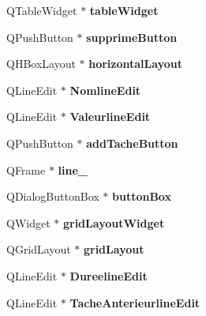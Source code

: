 \begin{DoxyCompactItemize}
Q\+Table\+Widget $\ast$ {\bfseries table\+Widget}
\item 
\mbox{\label{classUi__Dialog_a5f23c6524a49d1c5d2004cf289be792f}} 
Q\+Push\+Button $\ast$ {\bfseries supprime\+Button}
\item 
\mbox{\label{classUi__Dialog_ae66a1da203f045e33d71ed5abd46d2a1}} 
Q\+H\+Box\+Layout $\ast$ {\bfseries horizontal\+Layout}
\item 
\mbox{\label{classUi__Dialog_a848b9c33aa915967116a85f316b00de1}} 
Q\+Line\+Edit $\ast$ {\bfseries Nomline\+Edit}
\item 
\mbox{\label{classUi__Dialog_a62662d2bb293f62bb4391379c5955222}} 
Q\+Line\+Edit $\ast$ {\bfseries Valeurline\+Edit}
\item 
\mbox{\label{classUi__Dialog_afaaeb7b72ebafb7cc48b17030d584bd3}} 
Q\+Push\+Button $\ast$ {\bfseries add\+Tache\+Button}
\item 
\mbox{\label{classUi__Dialog_ab50855f90aba5911158d5e5d87784232}} 
Q\+Frame $\ast$ {\bfseries line\+\_}
\item 
\mbox{\label{classUi__Dialog_a5991d63e5d8f30a9a29671aeb370439a}} 
Q\+Dialog\+Button\+Box $\ast$ {\bfseries button\+Box}
\item 
\mbox{\label{classUi__Dialog_af56f0c59b650c50a635d4b11890c172e}} 
Q\+Widget $\ast$ {\bfseries grid\+Layout\+Widget}
\item 
\mbox{\label{classUi__Dialog_a41336d41594e8776a81d095e8e4ffc61}} 
Q\+Grid\+Layout $\ast$ {\bfseries grid\+Layout}
\item 
\mbox{\label{classUi__Dialog_ac9538bd9fd256d4dac4d498c2e6f567f}} 
Q\+Line\+Edit $\ast$ {\bfseries Dureeline\+Edit}
\item 
\mbox{\label{classUi__Dialog_a60a657ac3c963040418c76bca3ca8255}} 
Q\+Line\+Edit $\ast$ {\bfseries Tache\+Anterieurline\+Edit}
\item 
\mbox{\label{classUi__Dialog_a230786b63360bb74928496adacc76077}} 

\end{DoxyCompactItemize}

